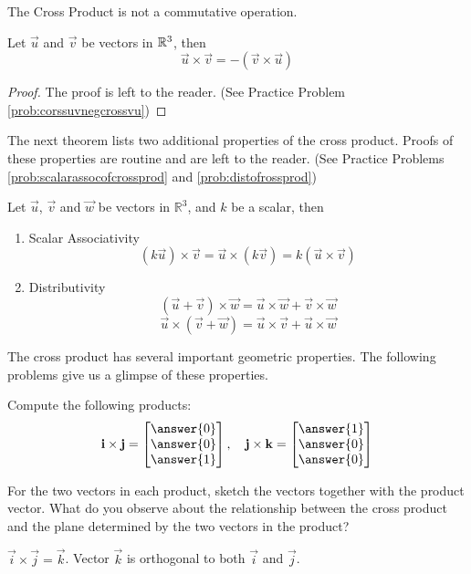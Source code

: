 \documentclass{ximera}
\begin{document}
\begin{warning}The Cross Product is not a commutative operation.
\end{warning}

\begin{theorem}\label{th:corssuvnegcrossvu}
Let $\vec{u}$ and $\vec{v}$ be vectors in $\mathbb{R}^3$, then
$$\vec{u}\times\vec{v}=-(\vec{v}\times\vec{u})$$
\end{theorem}
\begin{proof}
The proof is left to the reader.  (See Practice Problem \ref{prob:corssuvnegcrossvu})
\end{proof}
The next theorem lists two additional properties of the cross product.  Proofs of these properties are routine and are left to the reader.  (See Practice Problems \ref{prob:scalarassocofcrossprod} and \ref{prob:distofrossprod})
\begin{theorem}\label{th:crossproductproperties}
Let $\vec{u}$, $\vec{v}$ and $\vec{w}$ be vectors in $\mathbb{R}^3$, and $k$ be a scalar, then\\
\begin{enumerate}
\item\label{item:scalarassocofcrossprod} Scalar Associativity
$$(k\vec{u})\times \vec{v}=\vec{u}\times (k\vec{v})=k(\vec{u}\times \vec{v})$$
\item\label{item:distofrossprod} Distributivity
$$(\vec{u}+\vec{v})\times \vec{w}=\vec{u}\times \vec{w}+\vec{v}\times \vec{w}$$
$$\vec{u}\times (\vec{v}+\vec{w})=\vec{u}\times \vec{v}+\vec{u}\times \vec{w}$$
\end{enumerate}
\end{theorem}

The cross product has several important geometric properties. The following problems give us a glimpse of these properties.

\begin{exploration}\label{init:ijkcrossproducts}
Compute the following products:
$$\vec{i}\times\vec{j}=\begin{bmatrix}\answer{0}\\\answer{0}\\\answer{1}\end{bmatrix},\quad\vec{j}\times\vec{k}=\begin{bmatrix}\answer{1}\\\answer{0}\\\answer{0}\end{bmatrix}$$

For the two vectors in each product, sketch the vectors together with the product vector.  What do you observe about the relationship between the cross product and the plane determined by the two vectors in the product?  
\begin{hint}
$\vec{i}\times\vec{j}=\vec{k}$.  Vector $\vec{k}$ is orthogonal to both $\vec{i}$ and $\vec{j}$.  
\end{hint}



\end{exploration}
\end{document}
